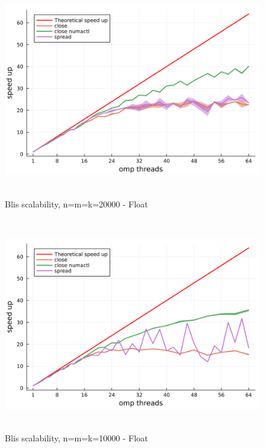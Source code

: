 \documentclass[
  letterpaper,
  DIV=11,
  numbers=noendperiod]{scrartcl}
\begin{document}
\begin{figure}

{\centering \includegraphics[width=\textwidth,height=3.64583in]{img/blis_scalability_20000.png}

}

\caption{Blis scalability, n=m=k=20000 - Float}

\end{figure}

\begin{figure}

{\centering \includegraphics[width=\textwidth,height=3.64583in]{img/blis_scalability_10000.png}

}

\caption{Blis scalability, n=m=k=10000 - Float}

\end{figure}
\end{document}

